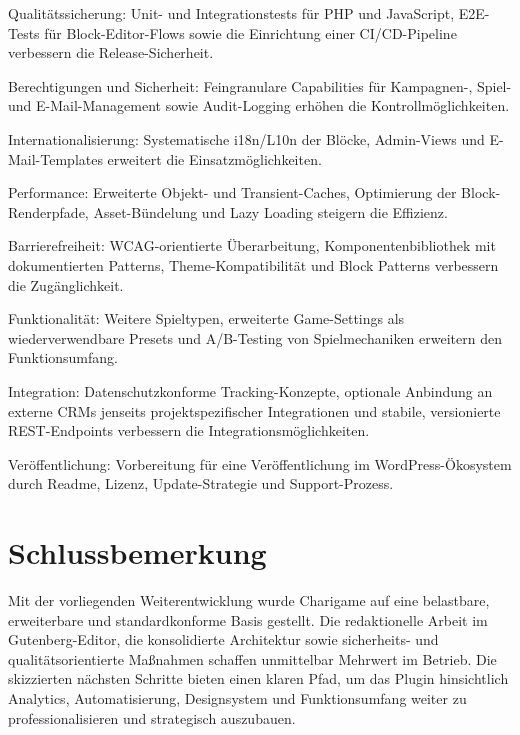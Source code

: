 Qualitätssicherung: Unit- und Integrationstests für PHP und JavaScript, E2E-Tests für Block-Editor-Flows sowie die Einrichtung einer CI/CD-Pipeline verbessern die Release-Sicherheit.

Berechtigungen und Sicherheit: Feingranulare Capabilities für Kampagnen-, Spiel- und E-Mail-Management sowie Audit-Logging erhöhen die Kontrollmöglichkeiten.

Internationalisierung: Systematische i18n/L10n der Blöcke, Admin-Views und E-Mail-Templates erweitert die Einsatzmöglichkeiten.

Performance: Erweiterte Objekt- und Transient-Caches, Optimierung der Block-Renderpfade, Asset-Bündelung und Lazy Loading steigern die Effizienz.

Barrierefreiheit: WCAG-orientierte Überarbeitung, Komponentenbibliothek mit dokumentierten Patterns, Theme-Kompatibilität und Block Patterns verbessern die Zugänglichkeit.

Funktionalität: Weitere Spieltypen, erweiterte Game-Settings als wiederverwendbare Presets und A/B-Testing von Spielmechaniken erweitern den Funktionsumfang.

Integration: Datenschutzkonforme Tracking-Konzepte, optionale Anbindung an externe CRMs jenseits projektspezifischer Integrationen und stabile, versionierte REST-Endpoints verbessern die Integrationsmöglichkeiten.

Veröffentlichung: Vorbereitung für eine Veröffentlichung im WordPress-Ökosystem durch Readme, Lizenz, Update-Strategie und Support-Prozess.

\section{Schlussbemerkung}
Mit der vorliegenden Weiterentwicklung wurde Charigame auf eine belastbare, erweiterbare und standardkonforme Basis gestellt.
Die redaktionelle Arbeit im Gutenberg-Editor, die konsolidierte Architektur sowie sicherheits- und qualitätsorientierte Maßnahmen schaffen unmittelbar Mehrwert im Betrieb.
Die skizzierten nächsten Schritte bieten einen klaren Pfad, um das Plugin hinsichtlich Analytics, Automatisierung, Designsystem und Funktionsumfang weiter zu professionalisieren und strategisch auszubauen.

